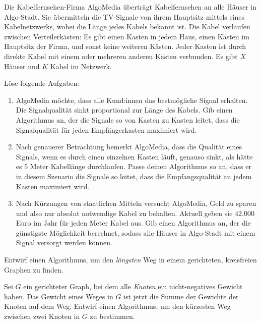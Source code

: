 \documentclass{uebung_cs}
\begin{document}
\begin{aufgabe}
	Die Kabelfernsehen-Firma AlgoMedia überträgt Kabelfernsehen an alle Häuser in Algo-Stadt.
	Sie übermitteln die TV-Signale von ihrem Hauptsitz mittels eines Kabelnetzwerks, wobei die Länge jedes Kabels bekannt ist.
	Die Kabel verlaufen zwischen Verteilerkästen:
	Es gibt einen Kasten in jedem Haus, einen Kasten im Hauptsitz der Firma, und sonst keine weiteren Kästen.
	Jeder Kasten ist durch direkte Kabel mit einem oder mehreren anderen Kästen verbunden. Es gibt $X$ Häuser und $K$ Kabel im Netzwerk.

	Löse folgende Aufgaben:
	\begin{enumerate}
		\item AlgoMedia möchte, dass alle Kund:innen das bestmögliche Signal erhalten.
		Die Signalqualität sinkt proportional zur Länge des Kabels.
		Gib einen Algorithmus an, der die Signale so von Kasten zu Kasten leitet, dass die Signalqualität für jeden Empfängerkasten maximiert wird.
		\item Nach genauerer Betrachtung bemerkt AlgoMedia, dass die Qualität eines Signals, wenn es durch einen einzelnen Kasten läuft, genauso sinkt, als hätte es 5 Meter Kabellänge durchlaufen.
		Passe deinen Algorithmus so an, dass er in diesem Szenario die Signale so leitet, dass die Empfangsqualität an jedem Kasten maximiert wird.
		\item Nach Kürzungen von staatlichen Mitteln versucht AlgoMedia, Geld zu sparen und also nur absolut notwendige Kabel zu behalten.
		Aktuell geben sie 42.000 Euro im Jahr für jeden Meter Kabel aus.
		Gib einen Algorithmus an, der die günstigste Möglichkeit berechnet, sodass alle Häuser in Algo-Stadt mit einem Signal versorgt werden können.
	\end{enumerate}
\end{aufgabe}


\begin{aufgabe}
	Entwirf einen Algorithmus, um den \emph{längsten} Weg in einem gerichteten, kreisfreien Graphen zu finden.
\end{aufgabe}

\begin{aufgabe}
	Sei $G$ ein gerichteter Graph, bei dem alle \emph{Knoten} ein nicht-negatives Gewicht haben.
	Das Gewicht eines Weges in $G$ ist jetzt die Summe der Gewichte der Knoten auf dem Weg.
	Entwirf einen Algorithmus, um den kürzesten Weg zwischen zwei Knoten in $G$ zu bestimmen.
\end{aufgabe}
\end{document}
